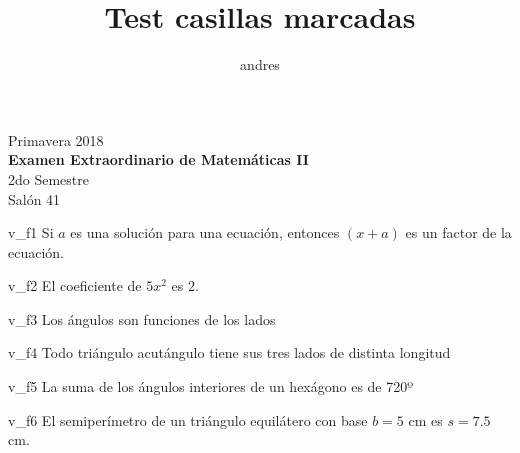 \documentclass[a4paper]{article}
\title{Test casillas marcadas}
\author{andres}
\begin{document}
\begin{center}
Primavera 2018 \\
\textbf{Examen Extraordinario de Matemáticas II } \\
2do Semestre \\
Salón 41
\end{center}


\begin{question}{v_f1}
Si \(a\) es una solución para una ecuación, entonces \((x + a)\) es un factor de la ecuación. 
\begin{choices}
\end{choices}
\end{question}

\begin{question}{v_f2}
El coeficiente de \(5x^2\) es \(2\).
\begin{choices}
\end{choices}
\end{question}

\begin{question}{v_f3}
Los ángulos son funciones de los lados
\begin{choices}
\end{choices}
\end{question}

\begin{question}{v_f4}
Todo triángulo acutángulo tiene sus tres lados de distinta longitud
\begin{choices}
\end{choices}
\end{question}

\begin{question}{v_f5}
 La suma de los ángulos interiores de un hexágono es de 720º
 \begin{choices}
\end{choices}
\end{question}

\begin{question}{v_f6}
El semiperímetro de un triángulo equilátero con base \(b=5\) cm es \(s= 7.5 \) cm. 
\begin{choices}
\end{choices}
\end{question}
\end{document}
